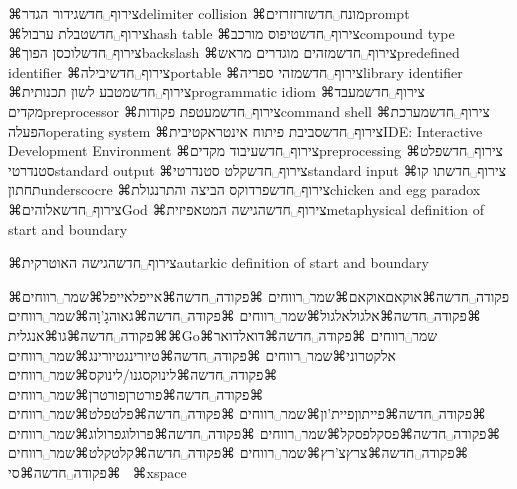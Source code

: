 ⌘צירוף␣חדש{גידור הגדר}{delimiter collision}
⌘מונח␣חדש{זרז}{זרזים}{prompt}
⌘צירוף␣חדש{טבלת ערבול}{hash table}
⌘צירוף␣חדש{טיפוס מורכב}{compound type}
⌘צירוף␣חדש{לוכסן הפוך}{backslash}
⌘צירוף␣חדש{מזהים מוגדרים מראש}{predefined identifier}
⌘צירוף␣חדש{יבילה}{portable}
⌘צירוף␣חדש{מזהי ספריה}{library identifier}
⌘צירוף␣חדש{מטבע לשון תכנותית}{programmatic idiom}
⌘צירוף␣חדש{מעבד מקדים}{preprocessor}
⌘צירוף␣חדש{מעטפת פקודות}{command shell}
⌘צירוף␣חדש{מערכת הפעלה}{operating system}
⌘צירוף␣חדש{סביבת פיתוח אינטראקטיבית}{IDE: Interactive Development Environment}
⌘צירוף␣חדש{עיבוד מקדים}{preprocessing}
⌘צירוף␣חדש{פלט סטנדרטי}{standard output}
⌘צירוף␣חדש{קלט סטנדרטי}{standard input}
⌘צירוף␣חדש{תו קו תחתון}{underscocre}
⌘צירוף␣חדש{פרדוקס הביצה והתרנגולת}{chicken and egg paradox}
⌘צירוף␣חדש{אלוהים}{God}
⌘צירוף␣חדש{הגישה המטאפיזית}{metaphysical definition of start and boundary}

⌘צירוף␣חדש{הגישה האוטרקית}{autarkic definition of start and boundary}




    
⌘פקודה␣חדשה⌘אוקאם{אוקאם⌘שמר␣רווחים}
⌘פקודה␣חדשה⌘אייפל{אייפל⌘שמר␣רווחים}
⌘פקודה␣חדשה⌘אלגול{אלגול⌘שמר␣רווחים}
⌘פקודה␣חדשה⌘גאוה{גָ'וָה⌘שמר␣רווחים}
⌘פקודה␣חדשה⌘גו{⌘אנגלית{⌘Go}⌘שמר␣רווחים}
⌘פקודה␣חדשה⌘דואל{דואר אלקטרוני⌘שמר␣רווחים}
⌘פקודה␣חדשה⌘טיורינג{טיורינג⌘שמר␣רווחים}
⌘פקודה␣חדשה⌘לינוקס{גנו/לינוקס⌘שמר␣רווחים}
⌘פקודה␣חדשה⌘פורטרן{פורטרן⌘שמר␣רווחים}
⌘פקודה␣חדשה⌘פייתון{פיית'ון⌘שמר␣רווחים}
⌘פקודה␣חדשה⌘פלט{פלט⌘שמר␣רווחים}
⌘פקודה␣חדשה⌘פסקל{פסקל⌘שמר␣רווחים}
⌘פקודה␣חדשה⌘פרולוג{פרולוג⌘שמר␣רווחים}
⌘פקודה␣חדשה⌘צרץ{צ'רץ⌘שמר␣רווחים}
⌘פקודה␣חדשה⌘קלט{קלט⌘שמר␣רווחים}
⌘פקודה␣חדשה⌘סי{%
\unskip~⌘xspace}


